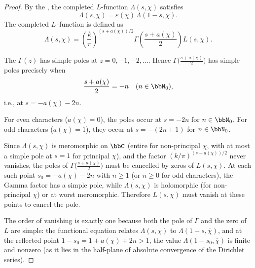 \begin{proof}
    By the , the completed $L$-function $\Lambda(s,\chi)$ satisfies
    $$\Lambda(s, \chi) = \varepsilon(\chi)\, \Lambda(1 - s, \overline{\chi}).$$
    The completed $L$--function is defined as
    $$\Lambda(s,\chi) = \left(\frac{k}{\pi}\right)^{(s+a(\chi))/2} \Gamma\!\left(\frac{s + a(\chi)}{2}\right) L(s, \chi).$$

    The  $\Gamma(z)$ has simple poles at $z = 0, -1, -2, \ldots$. Hence $\Gamma\bigl(\frac{s + a(\chi)}{2}\bigr)$ has simple poles precisely when
    $$\frac{s + a(\chi)}{2} = -n \quad (n \in \bbN_0),$$
    i.e., at $s = -a(\chi) - 2n$.

    For even characters ($a(\chi) = 0$), the poles occur at $s = -2n$ for $n \in \bbN_0$. For odd characters ($a(\chi) = 1$), they occur at $s = -(2n+1)$ for $n \in \bbN_0$.

    Since $\Lambda(s,\chi)$ is meromorphic on $\bbC$ (entire for non-principal $\chi$, with at most a simple pole at $s=1$ for principal $\chi$), and the factor $(k/\pi)^{(s+a(\chi))/2}$ never vanishes, the poles of $\Gamma\bigl(\frac{s + a(\chi)}{2}\bigr)$ must be cancelled by zeros of $L(s,\chi)$. At each such point $s_0 = -a(\chi) - 2n$ with $n \geq 1$ (or $n \geq 0$ for odd characters), the Gamma factor has a simple pole, while $\Lambda(s,\chi)$ is holomorphic (for non-principal $\chi$) or at worst meromorphic. Therefore $L(s,\chi)$ must vanish at these points to cancel the pole.

    The order of vanishing is exactly one because both the pole of $\Gamma$ and the zero of $L$ are simple: the functional equation relates $\Lambda(s,\chi)$ to $\Lambda(1-s, \overline{\chi})$, and at the reflected point $1 - s_0 = 1 + a(\chi) + 2n > 1$, the value $\Lambda(1-s_0, \overline{\chi})$ is finite and nonzero (as it lies in the half-plane of absolute convergence of the Dirichlet series).
\end{proof}